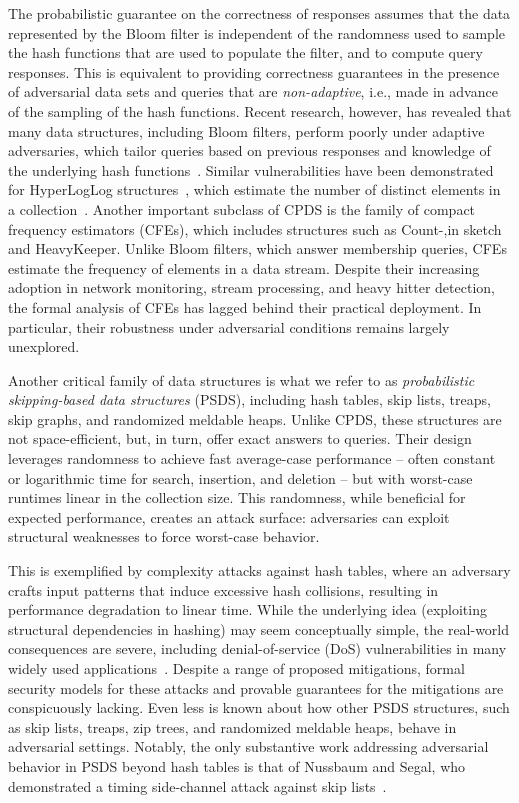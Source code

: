 The probabilistic guarantee on the correctness of responses assumes that the data represented by the Bloom filter is independent of the randomness used to sample the hash functions that are used to populate the filter, and to compute query responses.  This is equivalent to providing correctness guarantees in the presence of adversarial data sets and queries that are \emph{non-adaptive}, i.e., made in advance of the sampling of the hash functions.  Recent research, however, has revealed that many data structures, including Bloom filters, perform poorly under adaptive adversaries, which tailor queries based on previous responses and knowledge of the underlying hash functions~\cite{naor2015bloom,clayton2019,CCS:FPUV22,filic2025deletions}. Similar vulnerabilities have been demonstrated for HyperLogLog structures~\cite{PatersonR22}, which estimate the number of distinct elements in a collection~\cite{flajolet2007hyperloglog}. Another important subclass of CPDS is the family of compact frequency estimators (CFEs), which includes structures such as Count-,in sketch and HeavyKeeper. Unlike Bloom filters, which answer membership queries, CFEs estimate the frequency of elements in a data stream. Despite their increasing adoption in network monitoring, stream processing, and heavy hitter detection, the formal analysis of CFEs has lagged behind their practical deployment. In particular, their robustness under adversarial conditions remains largely unexplored.

Another critical family of data structures is what we refer to as \emph{probabilistic skipping-based data structures} (PSDS), including  hash tables, skip lists, treaps, skip graphs, and randomized meldable heaps. Unlike CPDS, these structures are not space-efficient, but, in turn, offer exact answers to queries. Their design leverages randomness to achieve fast average-case performance -- often constant or logarithmic time for search, insertion, and deletion -- but with worst-case runtimes linear in the collection size. This randomness, while beneficial for expected performance, creates an attack surface: adversaries can exploit structural weaknesses to force worst-case behavior.

This is exemplified by complexity attacks against hash tables, where an adversary crafts input patterns that induce excessive hash collisions, resulting in performance degradation to linear time. While the underlying idea (exploiting structural dependencies in hashing) may seem conceptually simple, the real-world consequences are severe, including denial-of-service (DoS) vulnerabilities in many widely used applications~\cite{CrosbyW03,klink2011efficient,aumasson2012hash,rosen2014netfilter,bottinelli2025hash}. Despite a range of proposed mitigations, formal security models for these attacks and provable guarantees for the mitigations are conspicuously lacking. Even less is known about how other PSDS structures, such as skip lists, treaps, zip trees, and randomized meldable heaps, behave in adversarial settings. Notably, the only substantive work addressing adversarial behavior in PSDS beyond hash tables is that of Nussbaum and Segal, who demonstrated a timing side-channel attack against skip lists~\cite{nussbaum2019skiplist}.

